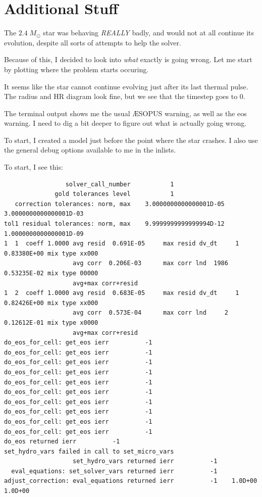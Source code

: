 \documentclass[a4paper,10pt]{article}
\begin{document}
\section{Additional Stuff}
\begin{figure}[ht]
    \centering
\end{figure}

\begin{figure}[ht]
    \centering
\end{figure}
\label{sec:debug}

The \(2.4\;M_\odot \) star was behaving \emph{REALLY} badly, and would not at all continue its evolution, despite all sorts of attempts to help the solver.

Because of this, I decided to look into \emph{what} exactly is going wrong. Let me start by plotting where the problem starts occuring.

\begin{figure}[ht]
    \centering
\end{figure}

It seems like the star cannot continue evolving just after its last thermal pulse. The radius and HR diagram look fine, but we see that the timestep goes to 0.

The terminal output shows me the usual \AE SOPUS warning, as well as the eos warning. I need to dig a bit deeper to figure out what is actually going wrong.

To start, I created a model just before the point where the star crashes.
I also use the general debug options available to me in the inlists.

To start, I see this:
\begin{verbatim}
                 solver_call_number           1
              gold tolerances level           1
   correction tolerances: norm, max    3.0000000000000001D-05    3.0000000000000001D-03
tol1 residual tolerances: norm, max    9.9999999999999994D-12    1.0000000000000001D-09
1  1  coeff 1.0000 avg resid  0.691E-05     max resid dv_dt     1  0.83380E+00 mix type xx000
                   avg corr  0.206E-03      max corr lnd  1986  0.53235E-02 mix type 00000
                   avg+max corr+resid
1  2  coeff 1.0000 avg resid  0.683E-05     max resid dv_dt     1  0.82426E+00 mix type xx000
                   avg corr  0.573E-04      max corr lnd     2  0.12612E-01 mix type x0000
                   avg+max corr+resid
do_eos_for_cell: get_eos ierr          -1
do_eos_for_cell: get_eos ierr          -1
do_eos_for_cell: get_eos ierr          -1
do_eos_for_cell: get_eos ierr          -1
do_eos_for_cell: get_eos ierr          -1
do_eos_for_cell: get_eos ierr          -1
do_eos_for_cell: get_eos ierr          -1
do_eos_for_cell: get_eos ierr          -1
do_eos_for_cell: get_eos ierr          -1
do_eos_for_cell: get_eos ierr          -1
do_eos returned ierr          -1
set_hydro_vars failed in call to set_micro_vars
                   set_hydro_vars returned ierr          -1
  eval_equations: set_solver_vars returned ierr          -1
adjust_correction: eval_equations returned ierr          -1    1.0D+00    1.0D+00
\end{verbatim}
\end{document}
